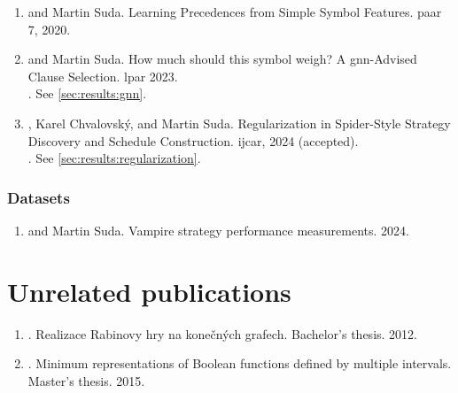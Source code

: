 \begin{enumerate}
\item {} and Martin Suda. Learning Precedences from Simple Symbol Features. \Gls{paar} 7, 2020. \cite{DBLP:conf/cade/Bartek020}
\item {} and Martin Suda. How much should this symbol weigh? A \acrshort{gnn}-Advised Clause Selection. \Gls{lpar} 2023. \cite{DBLP:conf/lpar/Bartek023}
\\
. See \cref{sec:results:gnn}.
\item {}, Karel Chvalovský, and Martin Suda. Regularization in Spider-Style Strategy Discovery and Schedule Construction. \Gls{ijcar}, 2024 (accepted). \cite{bartek2024regularization}
\\
. See \cref{sec:results:regularization}.
\end{enumerate}



\subsubsection{Datasets}

\begin{enumerate}
\item {} and Martin Suda. Vampire strategy performance measurements. 2024. \cite{bartek10814478}
\end{enumerate}

\section{Unrelated publications}

\begin{enumerate}
\item {}. \foreignlanguage{czech}{Realizace Rabinovy hry na konečných grafech}. Bachelor's thesis. 2012. \cite{Bartek2012thesis}
\item {}. Minimum representations of Boolean functions defined by multiple intervals. Master's thesis. 2015. \cite{bartek2015}
\end{enumerate}

